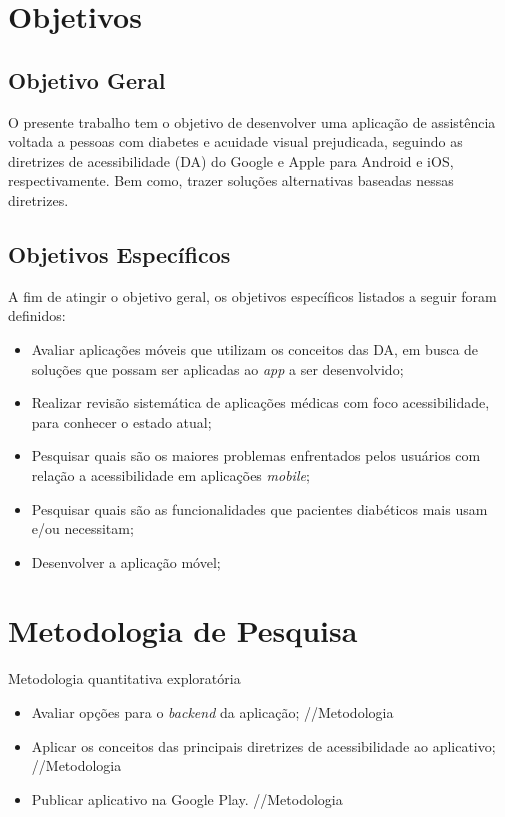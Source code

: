 \section{Objetivos}

\subsection{Objetivo Geral}

O presente trabalho tem o objetivo de desenvolver uma aplicação de assistência voltada a pessoas com diabetes e acuidade visual prejudicada, seguindo as diretrizes de acessibilidade (DA) do Google e Apple para Android e iOS, respectivamente. Bem como, trazer soluções alternativas baseadas nessas diretrizes.

\subsection{Objetivos Específicos}

A fim de atingir o objetivo geral, os objetivos específicos listados a seguir foram definidos:
\begin{itemize}
\item Avaliar aplicações móveis que utilizam os conceitos das DA, em busca de soluções que possam ser aplicadas ao \textit{app} a ser desenvolvido;
\item Realizar revisão sistemática de aplicações médicas com foco acessibilidade, para conhecer o estado atual;
\item Pesquisar quais são os maiores problemas enfrentados pelos usuários com relação a acessibilidade em aplicações \textit{mobile};
\item Pesquisar quais são as funcionalidades que pacientes diabéticos mais usam e/ou necessitam;
\item Desenvolver a aplicação móvel;
\end{itemize}

\section{Metodologia de Pesquisa}

Metodologia quantitativa exploratória

\begin{itemize}
\item Avaliar opções para o \textit{backend} da aplicação; //Metodologia
\item Aplicar os conceitos das principais diretrizes de acessibilidade ao aplicativo; //Metodologia
\item Publicar aplicativo na Google Play. //Metodologia
\end{itemize}

